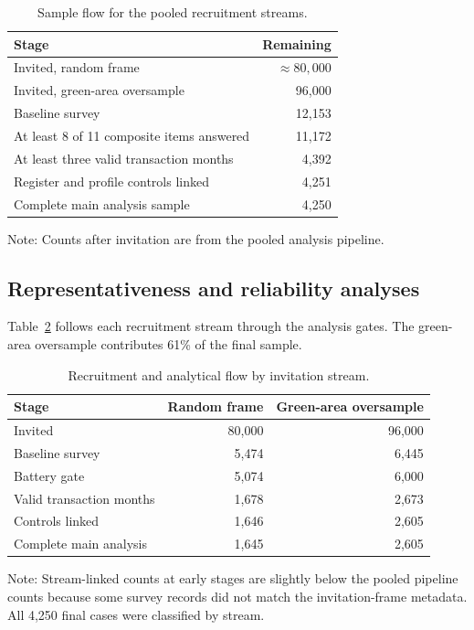 \documentclass[11pt,a4paper]{article}
\begin{document}
\begin{table}[htbp]
	\centering
	\caption{Sample flow for the pooled recruitment streams.}
	\label{tab:sample-flow}
	\begin{tabular}{@{}lr@{}}
		\toprule
		Stage & Remaining \\
		\midrule
		Invited, random frame & $\approx80,000$ \\
		Invited, green-area oversample & 96,000 \\
		Baseline survey & 12,153 \\
		At least 8 of 11 composite items answered & 11,172 \\
		At least three valid transaction months & 4,392 \\
		Register and profile controls linked & 4,251 \\
		Complete main analysis sample & 4,250 \\
		\bottomrule
	\end{tabular}
	\begin{flushleft}\footnotesize
		Note: Counts after invitation are from the pooled analysis pipeline.
	\end{flushleft}
\end{table}

\subsection{Representativeness and reliability analyses}
Table~\ref{tab:stream-flow} follows each recruitment stream through the
analysis gates. The green-area oversample contributes 61\% of the final sample.

\begin{table}[htbp]
	\centering
	\caption{Recruitment and analytical flow by invitation stream.}
	\label{tab:stream-flow}
	\begin{tabular}{@{}lrr@{}}
		\toprule
		Stage & Random frame & Green-area oversample \\
		\midrule
		Invited & 80,000 & 96,000 \\
		Baseline survey & 5,474 & 6,445 \\
		Battery gate & 5,074 & 6,000 \\
		Valid transaction months & 1,678 & 2,673 \\
		Controls linked & 1,646 & 2,605 \\
		Complete main analysis & 1,645 & 2,605 \\
		\bottomrule
	\end{tabular}
	\begin{flushleft}\footnotesize
		Note: Stream-linked counts at early stages are slightly below the pooled
		pipeline counts because some survey records did not match the invitation-frame
		metadata. All 4,250 final cases were classified by stream.
	\end{flushleft}
\end{table}
\end{document}

